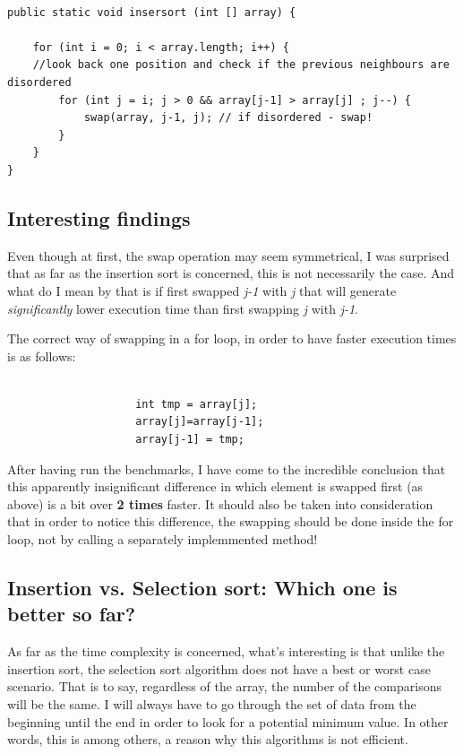 \documentclass[a4paper,11pt]{article}
\begin{document}
\begin{verbatim}

public static void insersort (int [] array) {

    for (int i = 0; i < array.length; i++) {
    //look back one position and check if the previous neighbours are disordered
        for (int j = i; j > 0 && array[j-1] > array[j] ; j--) { 
            swap(array, j-1, j); // if disordered - swap! 
        }
    }
}
\end{verbatim}

\subsection*{Interesting findings}

Even though at first, the swap operation may seem symmetrical, I was surprised that as far as the insertion sort is concerned, this is not necessarily the case.
And what do I mean by that is if first swapped \textit{j-1} with \textit{j} that will generate \textit{significantly} 
lower execution time than first swapping \textit{j} with
\textit{j-1}. \newline

The correct way of swapping in a for loop, in order to have faster execution times is as follows:

\begin{verbatim} 
    
                    int tmp = array[j];
                    array[j]=array[j-1];
                    array[j-1] = tmp;

\end{verbatim}

After having run the benchmarks, I have come to the incredible conclusion that this apparently insignificant difference in which element is swapped first (as above)
is a bit over \textbf{2 times} faster. 
It should also be taken into consideration that in order to notice this difference, the swapping should be done inside the
for loop, not by calling a separately implemmented method!




\subsection*{Insertion vs. Selection sort: Which one is better so far?}

As far as the time complexity is concerned, what's interesting is that unlike the insertion sort, 
the selection sort algorithm does 
not have a best or worst case scenario. That is to say, regardless of the array, the number of the comparisons will be the same. 
I will always have to go through the set of data from the 
beginning until the end in order to look for a potential minimum value. In other words, this is among others, a reason why this algorithms is not efficient.
\end{document}
